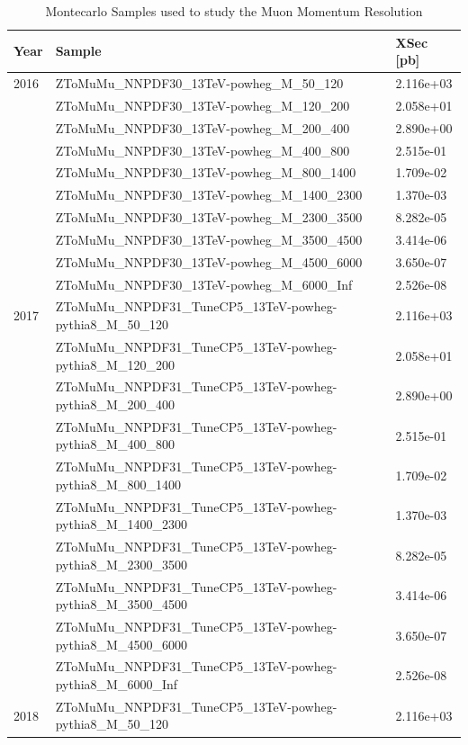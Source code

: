 \begin{table}
\begin{center}
  \caption{Montecarlo Samples used to study the Muon Momentum Resolution}
\footnotesize
\begin{tabular}{|l|l|l|}
\hline
Year & Sample & XSec [pb] \\ \hline
\hline
2016 & ZToMuMu\_NNPDF30\_13TeV-powheg\_M\_50\_120 & 2.116e+03\\
&ZToMuMu\_NNPDF30\_13TeV-powheg\_M\_120\_200 & 2.058e+01\\
&ZToMuMu\_NNPDF30\_13TeV-powheg\_M\_200\_400 & 2.890e+00\\
&ZToMuMu\_NNPDF30\_13TeV-powheg\_M\_400\_800 & 2.515e-01\\
&ZToMuMu\_NNPDF30\_13TeV-powheg\_M\_800\_1400 & 1.709e-02\\
&ZToMuMu\_NNPDF30\_13TeV-powheg\_M\_1400\_2300 & 1.370e-03\\
&ZToMuMu\_NNPDF30\_13TeV-powheg\_M\_2300\_3500 & 8.282e-05\\
&ZToMuMu\_NNPDF30\_13TeV-powheg\_M\_3500\_4500 & 3.414e-06\\
&ZToMuMu\_NNPDF30\_13TeV-powheg\_M\_4500\_6000 & 3.650e-07\\
&ZToMuMu\_NNPDF30\_13TeV-powheg\_M\_6000\_Inf & 2.526e-08\\
\hline
2017 & ZToMuMu\_NNPDF31\_TuneCP5\_13TeV-powheg-pythia8\_M\_50\_120 & 2.116e+03\\
&ZToMuMu\_NNPDF31\_TuneCP5\_13TeV-powheg-pythia8\_M\_120\_200 & 2.058e+01\\
&ZToMuMu\_NNPDF31\_TuneCP5\_13TeV-powheg-pythia8\_M\_200\_400 & 2.890e+00\\
&ZToMuMu\_NNPDF31\_TuneCP5\_13TeV-powheg-pythia8\_M\_400\_800 & 2.515e-01\\
&ZToMuMu\_NNPDF31\_TuneCP5\_13TeV-powheg-pythia8\_M\_800\_1400 & 1.709e-02\\
&ZToMuMu\_NNPDF31\_TuneCP5\_13TeV-powheg-pythia8\_M\_1400\_2300 & 1.370e-03\\
&ZToMuMu\_NNPDF31\_TuneCP5\_13TeV-powheg-pythia8\_M\_2300\_3500 & 8.282e-05\\
&ZToMuMu\_NNPDF31\_TuneCP5\_13TeV-powheg-pythia8\_M\_3500\_4500 & 3.414e-06\\
&ZToMuMu\_NNPDF31\_TuneCP5\_13TeV-powheg-pythia8\_M\_4500\_6000 & 3.650e-07\\
&ZToMuMu\_NNPDF31\_TuneCP5\_13TeV-powheg-pythia8\_M\_6000\_Inf & 2.526e-08\\
\hline
2018 & ZToMuMu\_NNPDF31\_TuneCP5\_13TeV-powheg-pythia8\_M\_50\_120 & 2.116e+03\\

\end{tabular}
\end{center}
\end{table}
